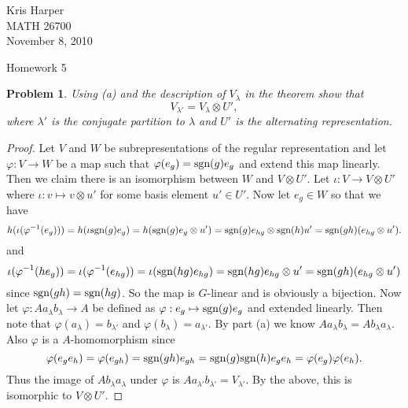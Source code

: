 \documentclass{article}
\newcommand{\sgn}{\textup{sgn}}
\newtheorem{problem}{Problem}
\begin{document}
\begin{flushright}
Kris Harper\\

MATH 26700\\

November 8, 2010
\end{flushright}

\begin{center}
Homework 5
\end{center}

\begin{problem}
Using (a) and the description of $V_{\lambda}$ in the theorem show that
\[
V_{\lambda'} = V_{\lambda} \otimes U',
\]
where $\lambda'$ is the conjugate partition to $\lambda$ and $U'$ is the alternating representation.
\end{problem}
\begin{proof}
Let $V$ and $W$ be subrepresentations of the regular representation and let $\varphi : V \to W$ be a map such that $\varphi(e_g) = \sgn(g) e_g$ and extend this map linearly. Then we claim there is an isomorphism between $W$ and $V \otimes U'$. Let $\iota : V \to V \otimes U'$ where $\iota : v \mapsto v \otimes u'$ for some basis element $u' \in U'$. Now let $e_g \in W$ so that we have
\[
h(\iota(\varphi^{-1}(e_g))) = h(\iota \sgn(g) e_g) = h(\sgn(g) e_g \otimes u') = \sgn(g) e_{hg} \otimes \sgn(h) u' = \sgn(gh)(e_{hg} \otimes u').
\]
and
\[
\iota(\varphi^{-1}(he_g)) = \iota(\varphi^{-1}(e_{hg})) =\iota(\sgn(hg) e_{hg}) = \sgn(hg)e_{hg} \otimes u' = \sgn(gh)(e_{hg} \otimes u')
\]
since $\sgn(gh) = \sgn(hg)$. So the map is $G$-linear and is obviously a bijection. Now let $\varphi : Aa_{\lambda}b_{\lambda} \to A$ be defined as $\varphi : e_g \mapsto \sgn(g)e_g$ and extended linearly. Then note that $\varphi(a_{\lambda}) = b_{\lambda'}$ and $\varphi(b_{\lambda}) = a_{\lambda'}$. By part (a) we know $Aa_{\lambda}b_{\lambda} = Ab_{\lambda}a_{\lambda}$. Also $\varphi$ is a $A$-homomorphism since
\[
\varphi(e_ge_h) = \varphi(e_{gh}) = \sgn(gh)e_{gh} = \sgn(g)\sgn(h)e_ge_h = \varphi(e_g)\varphi(e_h).
\]
Thus the image of $Ab_{\lambda}a_{\lambda}$ under $\varphi$ is $Aa_{\lambda'}b_{\lambda'} = V_{\lambda'}$. By the above, this is isomorphic to $V \otimes U'$.
\end{proof}
\end{document}
